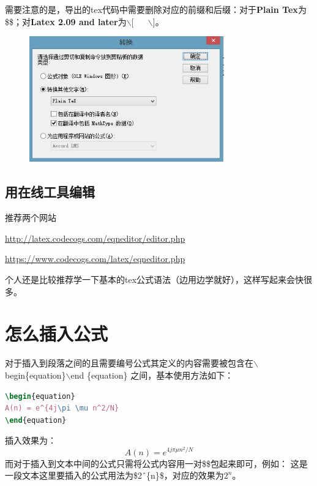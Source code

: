 需要注意的是，导出的tex代码中需要删除对应的前缀和后缀：对于\textbf{Plain Tex}为\$\$；对\textbf{Latex 2.09 and later}为$\backslash$[ $\quad$ $\backslash$]。

\begin{figure}[h]
\centering
 \includegraphics[width=0.75\textwidth]{chapters/figures/copy_type.jpg}
\end{figure}
\subsection{用在线工具编辑}
推荐两个网站

\url{http://latex.codecogs.com/eqneditor/editor.php}

\url{https://www.codecogs.com/latex/eqneditor.php}

个人还是比较推荐学一下基本的tex公式语法（边用边学就好），这样写起来会快很多。

\section{怎么插入公式}
对于插入到段落之间的且需要编号公式其定义的内容需要被包含在$\backslash$begin\{equation\}$\backslash$end \{equation\} 之间，基本使用方法如下：
\begin{lstlisting}[language={tex}, caption={插入公式基本操作}]
\begin{equation}
A(n) = e^{4j\pi \mu n^2/N}
\end{equation}
\end{lstlisting}
插入效果为：
\begin{equation}
A(n) = e^{4j\pi \mu n^2/N}
\end{equation}
而对于插入到文本中间的公式只需将公式内容用一对\$\$包起来即可，例如：
这是一段文本这里要插入的公式用法为\$2\^\ \{n\}\$，对应的效果为$2^{n}$。
